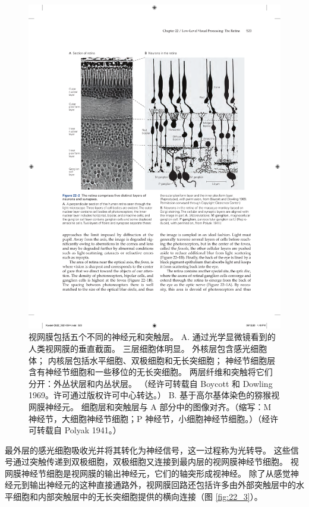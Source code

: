 \begin{figure}[htbp]
	\centering
	\includegraphics[width=1.0\linewidth]{chap22/fig_22_2}
	\caption{视网膜包括五个不同的神经元和突触层。 
		A. 通过光学显微镜看到的人类视网膜的垂直截面。 
		三层细胞体明显。 
		外核层包含感光细胞体； 内核层包括水平细胞、双极细胞和无长突细胞； 神经节细胞层含有神经节细胞和一些移位的无长突细胞。 
		两层纤维和突触将它们分开：外丛状层和内丛状层。 （经许可转载自 Boycott 和 Dowling 1969。许可通过版权许可中心转达。） 
		B. 基于高尔基体染色的猕猴视网膜神经元。 
		细胞层和突触层与 A 部分中的图像对齐。（缩写：M 神经节，大细胞神经节细胞；P 神经节，小细胞神经节细胞。）（经许可转载自 Polyak 1941。）}
	\label{fig:22_2}
\end{figure}


最外层的感光细胞吸收光并将其转化为神经信号，这一过程称为光转导。 
这些信号通过突触传递到双极细胞，双极细胞又连接到最内层的视网膜神经节细胞。 
视网膜神经节细胞是视网膜的输出神经元，它们的轴突形成视神经。 
除了从感觉神经元到输出神经元的这种直接通路外，视网膜回路还包括许多由外部突触层中的水平细胞和内部突触层中的无长突细胞提供的横向连接（图 \ref{fig:22_3}）。

